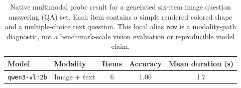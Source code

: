 \begin{table}[t]
\centering
\caption{Native multimodal probe result for a generated six-item image question answering (QA) set.  Each item contains a simple rendered colored shape and a multiple-choice text question.  This local alias row is a modality-path diagnostic, not a benchmark-scale vision evaluation or reproducible model claim.}
\label{tab:multimodal_probe}
\begin{tabular}{llccc}
\toprule
Model & Modality & Items & Accuracy & Mean duration (s) \\
\midrule
\texttt{qwen3-vl:2b} & Image + text & 6 & 1.00 & 1.7 \\
\bottomrule
\end{tabular}
\end{table}
